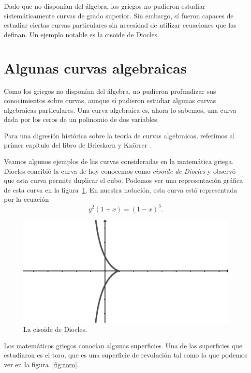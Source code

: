 Dado que no disponían del álgebra, los griegos no
pudieron estudiar sistemáticamente curvas de grado superior. Sin embargo, sí
fueron capaces de estudiar ciertas curvas particulares sin necesidad de
utilizar ecuaciones que las definan. Un ejemplo notable es la cisoide de
Diocles. 

\section*{Algunas curvas algebraicas}

Como los griegos no disponían del álgebra, no pudieron profundizar sus
conocimientos sobre curvas, aunque sí pudieron estudiar algunas curvas
algebraicas particulares. Una curva algebraica es, ahora lo sabemos, 
una curva dada por los ceros
de un polinomio de dos variables.  

Para una digresión histórica sobre la teoría
de curvas algebraicas, referimos al primer capítulo del libro de Brieskorn y
Kn\"{o}rrer \cite{MR2975988}.

Veamos algunos ejemplos de las curvas consideradas en la matemática griega. 
Diocles concibió la curva de hoy conocemos como \emph{cisoide de Diocles} y observó que
esta curva permite duplicar el cubo. Podemos ver una representación gráfica de
esta curva en la figura~\ref{fig:cisoide}. En nuestra notación, esta curva
está representada por la ecuación
\[
	y^2(1+x)=(1-x)^3.
\]

\begin{figure}
   \centering
   \includegraphics[scale=0.3]{images/cisoide}
   \caption{La cisoide de Diocles.}
   \label{fig:cisoide}
\end{figure}

Los matemáticos griegos conocían algunas superficies. Una de las superficies
que estudiaron es el toro, que es una superficie de revolución tal como la que
podemos ver en la figura~\ref{fig:toro}. 

